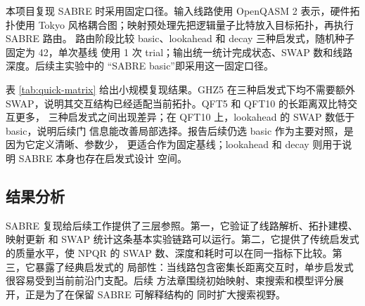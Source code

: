 本项目复现 SABRE 时采用固定口径。输入线路使用 OpenQASM 2 表示，硬件拓扑使用
Tokyo 风格耦合图；映射预处理先把逻辑量子比特放入目标拓扑，再执行 SABRE 路由。
路由阶段比较 basic、lookahead 和 decay 三种启发式，随机种子固定为 42，单次基线
使用 1 次 trial；输出统一统计完成状态、SWAP 数和线路深度。后续主实验中的
“SABRE basic”即采用这一固定口径。

表 \ref{tab:quick-matrix} 给出小规模复现结果。GHZ5 在三种启发式下均不需要额外
SWAP，说明其交互结构已经适配当前拓扑。QFT5 和 QFT10 的长距离双比特交互更多，
三种启发式之间出现差异；在 QFT10 上，lookahead 的 SWAP 数低于 basic，说明后续门
信息能改善局部选择。报告后续仍选 basic 作为主要对照，是因为它定义清晰、参数少，
更适合作为固定基线；lookahead 和 decay 则用于说明 SABRE 本身也存在启发式设计
空间。



\subsection{结果分析}

SABRE 复现给后续工作提供了三层参照。第一，它验证了线路解析、拓扑建模、映射更新
和 SWAP 统计这条基本实验链路可以运行。第二，它提供了传统启发式的质量水平，使
NPQR 的 SWAP 数、深度和耗时可以在同一指标下比较。第三，它暴露了经典启发式的
局部性：当线路包含密集长距离交互时，单步启发式很容易受到当前前沿门支配。后续
方法章围绕初始映射、束搜索和模型评分展开，正是为了在保留 SABRE 可解释结构的
同时扩大搜索视野。
